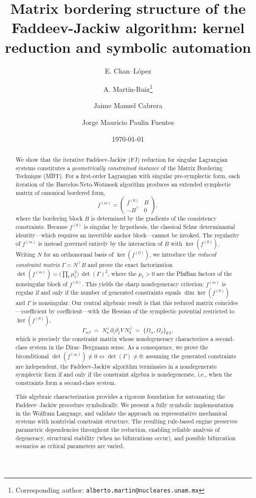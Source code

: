 \documentclass[11pt,a4paper]{article}
\title{\textbf{Matrix bordering structure of the Faddeev-Jackiw algorithm: kernel reduction and symbolic automation}}
\author[1]{E. Chan--López}
\author[2]{A. Martín-Ruiz\thanks{Corresponding author: \texttt{alberto.martin@nucleares.unam.mx}}}
\author[1]{Jaime Manuel Cabrera}
\author[1]{Jorge Mauricio Paulin Fuentes}
\affil[1]{División Académica de Ciencias Básicas, Universidad Juárez Autónoma de Tabasco (UJAT), Villahermosa, Tabasco, México}
\affil[2]{Instituto de Ciencias Nucleares, Universidad Nacional Autónoma de México (ICN-UNAM), Ciudad de México, México}
\date{\today}
\begin{document}
	
	\maketitle
	
	
	
	\begin{abstract}
		\noindent
		We show that the iterative Faddeev-Jackiw (FJ) reduction for singular Lagrangian systems constitutes a \textit{geometrically constrained instance} of the Matrix Bordering Technique (MBT). For a first-order Lagrangian with singular pre-symplectic form, each iteration of the Barcelos-Neto-Wotzasek algorithm produces an extended symplectic matrix of canonical bordered form,
		\[
		f^{(m)} =
		\begin{pmatrix}
			f^{(0)} & B \\
			- B^\top & 0
		\end{pmatrix},
		\]
		where the bordering block $B$ is determined by the gradients of the consistency constraints. Because $f^{(0)}$ is singular by hypothesis, the classical Schur determinantal identity---which requires an invertible anchor block---cannot be invoked. The regularity of $f^{(m)}$ is instead governed entirely by the interaction of $B$ with $\ker(f^{(0)})$. Writing $N$ for an orthonormal basis of $\ker(f^{(0)})$, we introduce the \emph{reduced constraint matrix} $\Gamma = N^{\top} B$ and prove the exact factorization $\det(f^{(m)}) = \bigl(\prod_\ell \mu_\ell^2\bigr)\,\det(\Gamma)^2$, where the $\mu_\ell>0$ are the Pfaffian factors of the nonsingular block of $f^{(0)}$. This yields the sharp nondegeneracy criterion: $f^{(m)}$ is regular if and only if the number of generated constraints equals $\dim\ker(f^{(0)})$ and $\Gamma$ is nonsingular. Our central algebraic result is that this reduced matrix coincides---coefficient by coefficient---with the Hessian of the symplectic potential restricted to $\ker(f^{(0)})$,
		\[
		\Gamma_{\alpha\beta} \;=\; N_a^{\,i}\,\partial_i\partial_j V\,N_b^{\,j} \;=\; \{\Omega_\alpha, \Omega_\beta\}_{\mathrm{FJ}},
		\]
		which is precisely the constraint matrix whose nondegeneracy characterizes a second-class system in the Dirac--Bergmann sense.
		As a consequence, we prove the biconditional $\det(f^{(m)}) \neq 0 \iff \det(\Gamma) \neq 0$: assuming the generated constraints are independent, the Faddeev-Jackiw algorithm terminates in a nondegenerate symplectic form if and only if the constraint algebra is nondegenerate, i.e., when the constraints form a second-class system.
		
		This algebraic characterization provides a rigorous foundation for automating the Faddeev–Jackiw procedure symbolically. We present a fully symbolic implementation in the Wolfram Language, and validate the approach on representative mechanical systems with nontrivial constraint structure. The resulting rule-based engine preserves parametric dependencies throughout the reduction, enabling reliable analysis of degeneracy, structural stability (when no bifurcations occur), and possible bifurcation scenarios as critical parameters are varied.
	\end{abstract}
	
\end{document}
